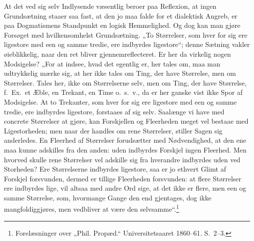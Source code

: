 \documentclass[12pt]{book}
\newcommand{\opage}[1]{\marginnote{\footnotesize\textit{[#1]}}}
\begin{document}
At det ved sig selv Indlysende væsentlig beroer paa Reflexion,
at ingen Grundsætning staaer saa fast, at den jo maa
falde for et dialektisk Angreb, er paa Dogmatismens Standpunkt
en logisk Hemmelighed. Og dog kan man gjøre Forsøget
med hvilkensomhelst Grundsætning. „To Størrelser,
som hver for sig ere ligestore med een og samme tredie, ere
\opage{256}indbyrdes ligestore“; denne Sætning vakler øieblikkelig, naar den ret bliver gjennemreflecteret. Er her da virkelig nogen Modsigelse? „For at indsee, hvad det egentlig er, her tales om, maa man udtrykkelig mærke sig, at her ikke tales om Ting, der have Størrelse, men om Størrelser. Tales her, ikke om Størrelserne selv, men om Ting, der have Størrelse, f.\ Ex.\ et Æble, en Trekant, en Time o.\ s.\ v., da er her ganske vist ikke Spor af Modsigelse. At to Trekanter, som hver for sig ere ligestore med een og samme tredie, ere indbyrdes ligestore, forstaaes af sig selv. Saalænge vi have med concrete Størrelser at gjøre, kan Forskjellen og Fleerheden meget vel bestaae med Ligestorheden; men naar der handles om rene Størrelser, stiller Sagen sig anderledes. En Fleerhed af Størrelser forudsætter med Nødvendighed, at den ene maa kunne adskilles fra den anden: uden indbyrdes Forskjel ingen Fleerhed. Men hvorved skulle rene Størrelser vel adskille sig fra hverandre indbyrdes uden ved Storheden? Ere Størrelserne indbyrdes ligestore, saa er jo ethvert Glimt af Forskjel forsvunden, dermed er tillige Fleerheden forsvunden: at flere Størrelser ere indbyrdes lige, vil altsaa med andre Ord sige, at det ikke er flere, men een og samme Størrelse, som, hvormange Gange den end gjentages, dog ikke mangfoldiggjøres, men vedbliver at være den selvsamme“.\footnote{Forelæsninger over „Phil. Propæd.“ Universitetsaaret 1860--61. S.~2--3.}%
\end{document}
